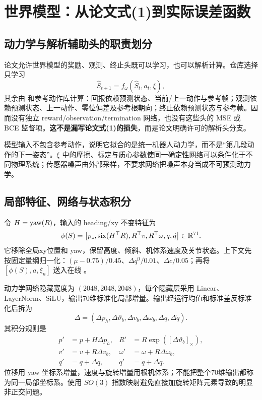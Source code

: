 \section{世界模型：从论文式(1)到实际误差函数}\label{sec:wm}
\subsection{动力学与解析辅助头的职责划分}
论文允许世界模型的奖励、观测、终止头既可以学习，也可以解析计算。仓库选择只学习
\begin{equation}
 \hat S_{t+1}=f_\omega(\hat S_t,a_t,\xi),
\end{equation}
其余由  和参考动作库计算：回报依赖预测状态、当前/上一动作与参考帧；观测依赖预测状态、上一动作、零位偏差及参考根朝向；终止依赖预测状态与参考帧。因而没有独立 reward/observation/termination 网络，也没有这些头的 MSE 或 BCE 监督项。\textbf{这不是漏写论文式(1)的损失}，而是论文明确许可的解析头分支。

模型输入不包含参考动作，说明它拟合的是统一机器人动力学，而不是“第几段动作的下一姿态”。$\xi$ 中的摩擦、标定与质心参数使同一确定性网络可以条件化于不同物理系统；传感器噪声由外部采样，不要求网络把噪声本身当成不可预测动力学。

\subsection{局部特征、网络与状态积分}
令 $H=\operatorname{yaw}(R)$，输入的 heading/xy 不变特征为
\begin{equation}
 \phi(S)=\big[p_z,\operatorname{six}(H^\top R),R^\top v,R^\top\omega,q,\dot q\big]\in\mathbb{R}^{71}.
\end{equation}
它移除全局xy位置和 yaw，保留高度、倾斜、机体系速度及关节状态。上下文先按固定量纲归一化：$(\mu-0.75)/0.45$、$\Delta q^0/0.01$、$\Delta c/0.05$；再将 $[\phi(S),a,\xi_n]$ 送入在线 。

动力学网络隐藏宽度为 $(2048,2048,2048)$，每个隐藏层采用 Linear、LayerNorm、SiLU，输出70维标准化局部增量。输出经运行均值和标准差反标准化后拆为
\begin{equation}
 \Delta=(\Delta p_h,\Delta\vartheta_b,\Delta v_b,\Delta\omega_b,\Delta q,\Delta\dot q).
\end{equation}
其积分规则是
\begin{align}
 p'&=p+H\Delta p_h,& R'&=R\exp([\Delta\vartheta_b]_\times),\\
 v'&=v+R\Delta v_b,&\omega'&=\omega+R\Delta\omega_b,\\
 q'&=q+\Delta q,&\dot q'&=\dot q+\Delta\dot q.
\end{align}
位移用 yaw 坐标系增量，速度与旋转增量用根机体系；不能把整个70维输出都称为同一局部坐标系。使用 $SO(3)$ 指数映射避免直接加旋转矩阵元素导致的明显非正交问题。

